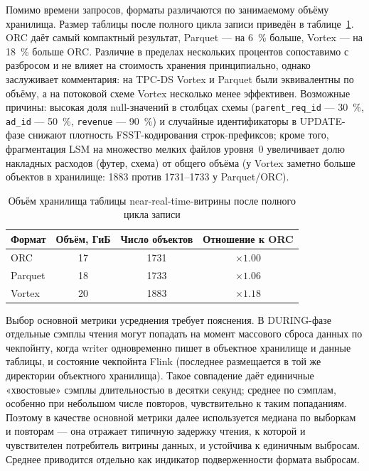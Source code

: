 Помимо времени запросов, форматы различаются по занимаемому объёму хранилища.
Размер таблицы после полного цикла записи приведён в таблице~\ref{tab:nrt-size}. ORC даёт самый компактный результат, Parquet --- на
\SI{6}{\percent} больше, Vortex --- на \SI{18}{\percent} больше ORC. Различие в
пределах нескольких процентов сопоставимо с разбросом и не влияет на стоимость
хранения принципиально, однако заслуживает комментария: на TPC-DS Vortex и Parquet
были эквивалентны по объёму, а на потоковой схеме Vortex несколько менее эффективен.
Возможные причины: высокая доля null-значений в столбцах схемы
(\texttt{parent\_req\_id} --- \SI{30}{\percent}, \texttt{ad\_id} --- \SI{50}{\percent},
\texttt{revenue} --- \SI{90}{\percent}) и случайные идентификаторы в UPDATE-фазе
снижают плотность FSST-кодирования строк-префиксов; кроме того, фрагментация LSM
на множество мелких файлов уровня~0 увеличивает долю накладных расходов (футер,
схема) от общего объёма (у Vortex заметно больше объектов в хранилище: 1883 против
1731--1733 у Parquet/ORC).

\begin{table}
    \caption{Объём хранилища таблицы near-real-time-витрины после полного цикла записи}
    \label{tab:nrt-size}
    \begin{tabularx}{\textwidth}{|X|c|c|c|}\hline
    \textbf{Формат} & \textbf{Объём, ГиБ} & \textbf{Число объектов} & \textbf{Отношение к ORC} \\ \hline
    ORC     & 17 & 1731 & ${\times}1.00$ \\ \hline
    Parquet & 18 & 1733 & ${\times}1.06$ \\ \hline
    Vortex  & 20 & 1883 & ${\times}1.18$ \\ \hline
    \end{tabularx}
\end{table}

Выбор основной метрики усреднения требует пояснения. В DURING-фазе отдельные сэмплы чтения
могут попадать на момент массового сброса данных по чекпойнту, когда writer
одновременно пишет в объектное хранилище и данные таблицы, и состояние чекпойнта
Flink (последнее размещается в той же директории объектного хранилища). Такое
совпадение даёт единичные «хвостовые» сэмплы длительностью в десятки секунд;
среднее по сэмплам, особенно при небольшом числе повторов, чувствительно к таким
попаданиям. Поэтому в качестве основной метрики далее используется медиана
по выборкам и повторам --- она отражает типичную задержку чтения, к которой и
чувствителен потребитель витрины данных, и устойчива к единичным выбросам.
Среднее приводится отдельно как индикатор подверженности формата выбросам.

